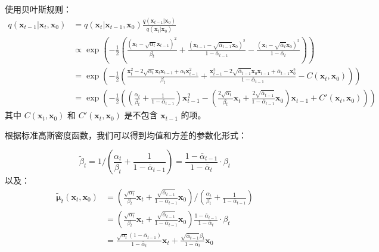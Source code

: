 \documentclass[zihao=-4, fontset=windows]{ctexart}
\begin{document}
使用贝叶斯规则：
\begin{equation}
\begin{aligned}
q(\mathbf{x}_{t-1} | \mathbf{x}_{t}, \mathbf{x}_{0}) & =q(\mathbf{x}_{t} | \mathbf{x}_{t-1}, \mathbf{x}_{0}) \frac{q(\mathbf{x}_{t-1} | \mathbf{x}_{0})}{q(\mathbf{x}_{t} | \mathbf{x}_{0})} \\
& \propto \exp \left(-\frac{1}{2}\left(\frac{(\mathbf{x}_{t}-\sqrt{\alpha_{t}} \mathbf{x}_{t-1})^{2}}{\beta_{t}}+\frac{(\mathbf{x}_{t-1}-\sqrt{\bar{\alpha}_{t-1}} \mathbf{x}_{0})^{2}}{1-\bar{\alpha}_{t-1}}-\frac{(\mathbf{x}_{t}-\sqrt{\bar{\alpha}_{t}} \mathbf{x}_{0})^{2}}{1-\bar{\alpha}_{t}}\right)\right) \\
& =\exp \left(-\frac{1}{2}\left(\frac{\mathbf{x}_{t}^{2}-2 \sqrt{\alpha_{t}} \mathbf{x}_{t} \mathbf{x}_{t-1}+\alpha_{t} \mathbf{x}_{t-1}^{2}}{\beta_{t}}+\frac{\mathbf{x}_{t-1}^{2}-2 \sqrt{\bar{\alpha}_{t-1}} \mathbf{x}_{0} \mathbf{x}_{t-1}+\bar{\alpha}_{t-1} \mathbf{x}_{0}^{2}}{1-\bar{\alpha}_{t-1}}-C(\mathbf{x}_t, \mathbf{x}_0)\right)\right) \\
& =\exp \left(-\frac{1}{2}\left(\left(\frac{\alpha_{t}}{\beta_{t}}+\frac{1}{1-\bar{\alpha}_{t-1}}\right) \mathbf{x}_{t-1}^{2}-\left(\frac{2 \sqrt{\alpha_{t}}}{\beta_{t}} \mathbf{x}_{t}+\frac{2 \sqrt{\bar{\alpha}_{t-1}}}{1-\bar{\alpha}_{t-1}} \mathbf{x}_{0}\right) \mathbf{x}_{t-1}+C'(\mathbf{x}_{t}, \mathbf{x}_{0})\right)\right)
\end{aligned}
\end{equation}
其中 $C(\mathbf{x}_t, \mathbf{x}_0)$ 和 $C'(\mathbf{x}_t, \mathbf{x}_0)$ 是不包含 $\mathbf{x}_{t-1}$ 的项。

根据标准高斯密度函数，我们可以得到均值和方差的参数化形式：

\begin{equation}
\tilde{\beta}_{t} = 1 /\left(\frac{\alpha_{t}}{\beta_{t}}+\frac{1}{1-\bar{\alpha}_{t-1}}\right) = \frac{1-\bar{\alpha}_{t-1}}{1-\bar{\alpha}_{t}} \cdot \beta_{t}
\end{equation}
以及：
\begin{equation}
\begin{aligned}
\tilde{\boldsymbol{\mu}}_{t}(\mathbf{x}_{t}, \mathbf{x}_{0}) & =\left(\frac{\sqrt{\alpha_{t}}}{\beta_{t}} \mathbf{x}_{t}+\frac{\sqrt{\bar{\alpha}_{t-1}}}{1-\bar{\alpha}_{t-1}} \mathbf{x}_{0}\right) /\left(\frac{\alpha_{t}}{\beta_{t}}+\frac{1}{1-\bar{\alpha}_{t-1}}\right) \\
& =\left(\frac{\sqrt{\alpha_{t}}}{\beta_{t}} \mathbf{x}_{t}+\frac{\sqrt{\bar{\alpha}_{t-1}}}{1-\bar{\alpha}_{t-1}} \mathbf{x}_{0}\right) \frac{1-\bar{\alpha}_{t-1}}{1-\bar{\alpha}_{t}} \cdot \beta_{t} \\
& =\frac{\sqrt{\alpha_{t}}(1-\bar{\alpha}_{t-1})}{1-\bar{\alpha}_{t}} \mathbf{x}_{t}+\frac{\sqrt{\bar{\alpha}_{t-1}} \beta_{t}}{1-\bar{\alpha}_{t}} \mathbf{x}_{0}
\end{aligned}
\end{equation}
\end{document}

